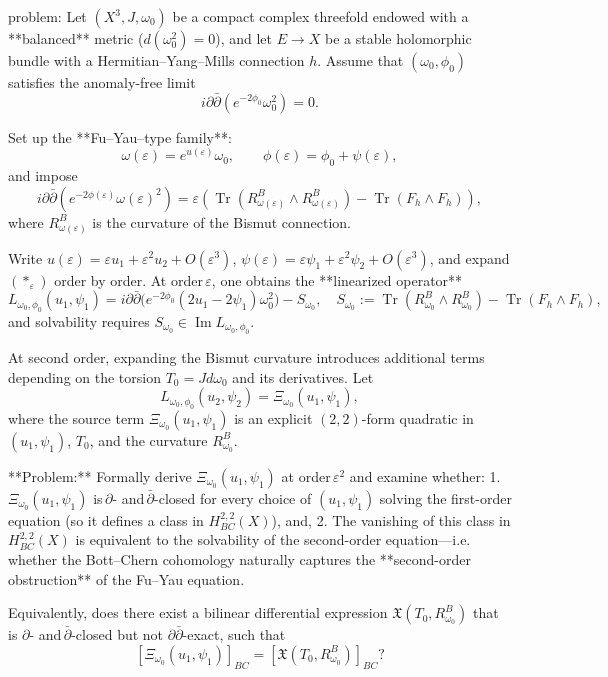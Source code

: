 problem:  
Let \((X^3,J,\omega_0)\) be a compact complex threefold endowed with a **balanced** metric (\(d(\omega_0^2)=0\)), and let \(E\to X\) be a stable holomorphic bundle with a Hermitian–Yang–Mills connection \(h\).  
Assume that \((\omega_0,\phi_0)\) satisfies the anomaly-free limit
\[
i\partial\bar\partial(e^{-2\phi_0}\omega_0^2)=0.
\]

Set up the **Fu–Yau–type family**:
\[
\omega(\varepsilon)=e^{u(\varepsilon)}\omega_0,\qquad 
\phi(\varepsilon)=\phi_0+\psi(\varepsilon),
\]
and impose
\[
i\partial\bar\partial(e^{-2\phi(\varepsilon)}\omega(\varepsilon)^2)
=\varepsilon(\operatorname{Tr}(R^B_{\omega(\varepsilon)}\wedge R^B_{\omega(\varepsilon)})-
\operatorname{Tr}(F_h\wedge F_h)),
\tag{$\ast_\varepsilon$}
\]
where \(R^B_{\omega(\varepsilon)}\) is the curvature of the Bismut connection.  

Write \(u(\varepsilon)=\varepsilon u_1+\varepsilon^2 u_2+O(\varepsilon^3)\),   
\(\psi(\varepsilon)=\varepsilon \psi_1+\varepsilon^2 \psi_2+O(\varepsilon^3)\),  
and expand \((\ast_\varepsilon)\) order by order.  
At order \(\varepsilon\), one obtains the **linearized operator**
\[
L_{\omega_0,\phi_0}(u_1,\psi_1)
= i\partial\bar\partial\big(e^{-2\phi_0}(2u_1-2\psi_1)\omega_0^2\big)
- S_{\omega_0}, \quad
S_{\omega_0}:=\operatorname{Tr}(R^B_{\omega_0}\wedge R^B_{\omega_0})-
\operatorname{Tr}(F_h\wedge F_h),
\]
and solvability requires \(S_{\omega_0}\in \operatorname{Im}L_{\omega_0,\phi_0}\).  

At second order, expanding the Bismut curvature introduces additional terms depending on the torsion \(T_0 = Jd\omega_0\) and its derivatives.  Let  
\[
L_{\omega_0,\phi_0}(u_2,\psi_2) = \Xi_{\omega_0}(u_1,\psi_1),
\]
where the source term \(\Xi_{\omega_0}(u_1,\psi_1)\) is an explicit \((2,2)\)-form quadratic in \((u_1,\psi_1)\), \(T_0\), and the curvature \(R^B_{\omega_0}\).

**Problem:**  
Formally derive \(\Xi_{\omega_0}(u_1,\psi_1)\) at order \(\varepsilon^2\) and examine whether:
1. \(\Xi_{\omega_0}(u_1,\psi_1)\) is \(\partial\)- and \(\bar\partial\)-closed for every choice of \((u_1,\psi_1)\) solving the first-order equation (so it defines a class in \(H^{2,2}_{BC}(X)\)), and,  
2. The vanishing of this class in \(H^{2,2}_{BC}(X)\) is equivalent to the solvability of the second-order equation—i.e. whether the Bott–Chern cohomology naturally captures the **second-order obstruction** of the Fu–Yau equation.  

Equivalently, does there exist a bilinear differential expression \(\mathfrak{X}(T_0,R^B_{\omega_0})\) that is \(\partial\)- and \(\bar\partial\)-closed but not \(\partial\bar\partial\)-exact, such that
\[
[\Xi_{\omega_0}(u_1,\psi_1)]_{BC}
=[\mathfrak{X}(T_0,R^B_{\omega_0})]_{BC}?
\]

